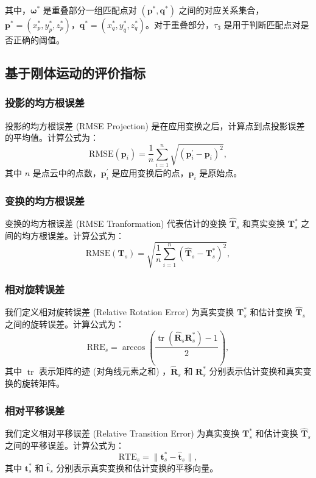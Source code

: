 其中，$\boldsymbol{\omega}^*$ 是重叠部分一组匹配点对 $(\boldsymbol{p}^*, \boldsymbol{q}^*)$ 之间的对应关系集合，$\boldsymbol{p}^* = (x^*_p, y^*_p, z^*_p)$，$\boldsymbol{q}^* = (x^*_q, y^*_q, z^*_q)$。对于重叠部分，$\tau_3$ 是用于判断匹配点对是否正确的阈值。

\subsection{基于刚体运动的评价指标}
\subsubsection{投影的均方根误差}
投影的均方根误差 (RMSE Projection) 是在应用变换之后，计算点到点投影误差的平均值。计算公式为：
\begin{equation}
    \text{RMSE} (\boldsymbol{p}_i) = \frac{1}{n}\sum_{i=1}^{n} \sqrt{(\boldsymbol{p}_i^{'} - \boldsymbol{p}_i)^2},
\end{equation}
其中 $n$ 是点云中的点数，$\boldsymbol{p}_i^{'}$ 是应用变换后的点，$\boldsymbol{p}_i$ 是原始点。

\subsubsection{变换的均方根误差}
变换的均方根误差 (RMSE Tranformation) 代表估计的变换 $\boldsymbol{\hat{T}}_{s}$ 和真实变换 $\boldsymbol{T}^*_{s}$ 之间的均方根误差。计算公式为：
\begin{equation}
    \text{RMSE} (\boldsymbol{T}_s) = \sqrt{\frac{1}{n}\sum_{i=1}^{n}(\boldsymbol{\hat{T}}_{s} - \boldsymbol{T}^*_{s})^2},
\end{equation}

\subsubsection{相对旋转误差}
我们定义相对旋转误差 (Relative Rotation Error) 为真实变换 $\boldsymbol{T}^*_{s}$ 和估计变换 $\boldsymbol{\hat{T}}_{s}$ 之间的旋转误差。计算公式为：
\begin{equation}
    \text{RRE}_s = \arccos \left(\frac{\operatorname{tr}(\boldsymbol{\hat{R}}_{s} \boldsymbol{R}^*_s) - 1}{2}\right),
\end{equation}
其中 $\operatorname{tr}$ 表示矩阵的迹 (对角线元素之和) ，$\boldsymbol{\hat{R}}_{s}$ 和 $\boldsymbol{R}^*_s$ 分别表示估计变换和真实变换的旋转矩阵。

\subsubsection{相对平移误差}
我们定义相对平移误差 (Relative Transition Error) 为真实变换 $\boldsymbol{T}^*_s$ 和估计变换 $\boldsymbol{\hat{T}}_{s}$ 之间的平移误差。计算公式为：
\begin{equation}
    \text{RTE}_s = \lVert \boldsymbol{t}^*_s - \boldsymbol{\hat{t}}_{s} \rVert,
\end{equation}
其中 $\boldsymbol{t}^*_s$ 和 $\boldsymbol{\hat{t}}_{s}$ 分别表示真实变换和估计变换的平移向量。

